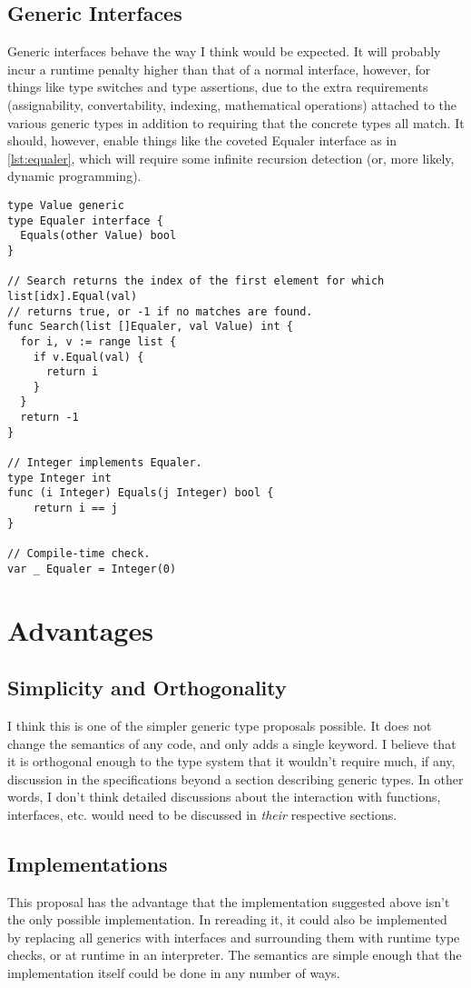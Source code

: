 \documentclass[10pt,a4paper]{article}
\newcommand{\Listing}[1]{\autoref{lst:#1}}
\begin{document}
\subsection{Generic Interfaces}
Generic interfaces behave the way I think would be expected.  It will probably incur a runtime penalty higher than that of a normal interface, however, for things like type switches and type assertions, due to the extra requirements (assignability, convertability, indexing, mathematical operations) attached to the various generic types in addition to requiring that the concrete types all match.  It should, however, enable things like the coveted Equaler interface as in \Listing{equaler}, which will require some infinite recursion detection (or, more likely, dynamic programming).

\begin{lstlisting}[float=htbp,caption={Equaler interface.},label=lst:equaler]
type Value generic
type Equaler interface {
  Equals(other Value) bool
}

// Search returns the index of the first element for which list[idx].Equal(val)
// returns true, or -1 if no matches are found.
func Search(list []Equaler, val Value) int {
  for i, v := range list {
    if v.Equal(val) {
      return i
    }
  }
  return -1
}

// Integer implements Equaler.
type Integer int
func (i Integer) Equals(j Integer) bool {
	return i == j
}

// Compile-time check.
var _ Equaler = Integer(0)
\end{lstlisting}

\section{Advantages}
\subsection{Simplicity and Orthogonality}
I think this is one of the simpler generic type proposals possible.  It does not change the semantics of any code, and only adds a single keyword.  I believe that it is orthogonal enough to the type system that it wouldn't require much, if any, discussion in the specifications beyond a section describing generic types.  In other words, I don't think detailed discussions about the interaction with functions, interfaces, etc. would need to be discussed in \textit{their} respective sections.

\subsection{Implementations}
This proposal has the advantage that the implementation suggested above isn't the only possible implementation.  In rereading it, it could also be implemented by replacing all generics with interfaces and surrounding them with runtime type checks, or at runtime in an interpreter.  The semantics are simple enough that the implementation itself could be done in any number of ways.
\end{document}
